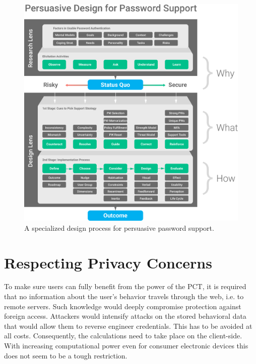 
\begin{figure}
	\centering
	\includegraphics[width=\linewidth]{figures/pst/PerdesPassup}
	\caption{\label{fig:pst:passup} A specialized design process for persuasive password support.}
\end{figure}

\section{Respecting Privacy Concerns}
To make sure users can fully benefit from the power of the PCT, it is required that no information about the user's behavior travels through the web, i.e. to remote servers. Such knowledge would deeply compromise protection against foreign access. Attackers would intensify attacks on the stored behavioral data that would allow them to reverse engineer credentials. This has to be avoided at all costs. Consequently, the calculations need to take place on the client-side. With increasing computational power even for consumer electronic devices this does not seem to be a tough restriction. 

